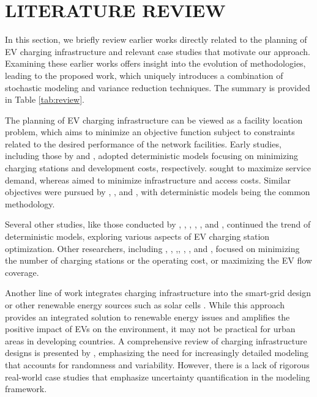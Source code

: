 \documentclass[preprint]{oscmjournal}
\theoremstyle{remark}
\begin{document}
\section{LITERATURE REVIEW}
\label{sec:lit_review}

In this section, we briefly review earlier works directly related to the planning of EV charging infrastructure and relevant case studies that motivate our approach.  Examining these earlier works offers insight into the evolution of methodologies, leading to the proposed work, which uniquely introduces a combination of stochastic modeling and variance reduction techniques. The summary is provided in Table \ref{tab:review}.



The planning of EV charging infrastructure can be viewed as a facility location problem, which aims to minimize an objective function subject to constraints related to the desired performance of the network facilities. Early studies, including those by \autocite{he2016sustainability} and \autocite{albana2022optimal}, adopted deterministic models focusing on minimizing charging stations and development costs, respectively. \autocite{ko2017determining} sought to maximize service demand, whereas \autocite{jegham2020locating} aimed to minimize infrastructure and access costs. Similar objectives were pursued by \autocite{asamer2016optimizing}, \autocite{frade2011optimal}, and \autocite{kunith2017electrification}, with deterministic models being the common methodology.

Several other studies, like those conducted by \textcite{spieker2017multi}, \textcite{fekete2016improved}, \textcite{yuan2015competitive}, \textcite{hua2019optimal}, \textcite{fredriksson2021optimal}, and \textcite{miljanic2018efficient}, continued the trend of deterministic models, exploring various aspects of EV charging station optimization. Other researchers, including \textcite{bouguerra2019determining}, \textcite{lo2020electric}, \textcite{sun2020locating},\textcite{huang2023geographic}, \textcite{hamed2023random}, \textcite{zhang2022bi}, and \textcite{amilia2022designing}, focused on minimizing the number of charging stations or the operating cost, or maximizing the EV flow coverage.

Another line of work integrates charging infrastructure into the smart-grid design \autocite{chen2012iems, lam2012multi, lam2012capacity} or other renewable energy sources such as solar cells \autocite{guo2012study}. While this approach provides an integrated solution to renewable energy issues and amplifies the positive impact of EVs on the environment, it may not be practical for urban areas in developing countries. A comprehensive review of charging infrastructure designs is presented by \textcite{unterluggauer2022electric}, emphasizing the need for increasingly detailed modeling that accounts for randomness and variability. However, there is a lack of rigorous real-world case studies that emphasize uncertainty quantification in the modeling framework.
\end{document}

